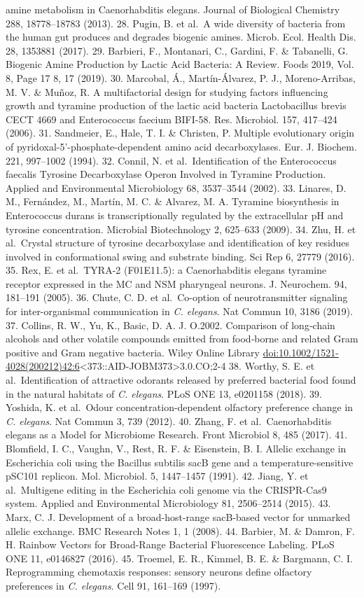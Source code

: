\documentclass[]{article}
\begin{document}
amine metabolism in Caenorhabditis elegans. Journal of Biological
Chemistry 288, 18778--18783 (2013). 28. Pugin, B. et al.~A wide
diversity of bacteria from the human gut produces and degrades biogenic
amines. Microb. Ecol. Health Dis. 28, 1353881 (2017). 29. Barbieri, F.,
Montanari, C., Gardini, F. \& Tabanelli, G. Biogenic Amine Production by
Lactic Acid Bacteria: A Review. Foods 2019, Vol. 8, Page 17 8, 17
(2019). 30. Marcobal, Á., Martín-Álvarez, P. J., Moreno-Arribas, M. V.
\& Muñoz, R. A multifactorial design for studying factors influencing
growth and tyramine production of the lactic acid bacteria Lactobacillus
brevis CECT 4669 and Enterococcus faecium BIFI-58. Res. Microbiol. 157,
417--424 (2006). 31. Sandmeier, E., Hale, T. I. \& Christen, P. Multiple
evolutionary origin of pyridoxal-5'-phosphate-dependent amino acid
decarboxylases. Eur. J. Biochem. 221, 997--1002 (1994). 32. Connil, N.
et al.~Identification of the Enterococcus faecalis Tyrosine
Decarboxylase Operon Involved in Tyramine Production. Applied and
Environmental Microbiology 68, 3537--3544 (2002). 33. Linares, D. M.,
Fernández, M., Martín, M. C. \& Alvarez, M. A. Tyramine biosynthesis in
Enterococcus durans is transcriptionally regulated by the extracellular
pH and tyrosine concentration. Microbial Biotechnology 2, 625--633
(2009). 34. Zhu, H. et al.~Crystal structure of tyrosine decarboxylase
and identification of key residues involved in conformational swing and
substrate binding. Sci Rep 6, 27779 (2016). 35. Rex, E. et al.~TYRA-2
(F01E11.5): a Caenorhabditis elegans tyramine receptor expressed in the
MC and NSM pharyngeal neurons. J. Neurochem. 94, 181--191 (2005). 36.
Chute, C. D. et al.~Co-option of neurotransmitter signaling for
inter-organismal communication in \textit{C. elegans}. Nat Commun 10,
3186 (2019). 37. Collins, R. W., Yu, K., Basic, D. A. J. O.2002.
Comparison of long‐chain alcohols and other volatile compounds emitted
from food‐borne and related Gram positive and Gram negative bacteria.
Wiley Online Library
\url{doi:10.1002/1521-4028(200212)42:6}\textless{}373::AID-JOBM373\textgreater{}3.0.CO;2-4
38. Worthy, S. E. et al.~Identification of attractive odorants released
by preferred bacterial food found in the natural habitats of
\textit{C. elegans}. PLoS ONE 13, e0201158 (2018). 39. Yoshida, K. et
al.~Odour concentration-dependent olfactory preference change in
\textit{C. elegans}. Nat Commun 3, 739 (2012). 40. Zhang, F. et
al.~Caenorhabditis elegans as a Model for Microbiome Research. Front
Microbiol 8, 485 (2017). 41. Blomfield, I. C., Vaughn, V., Rest, R. F.
\& Eisenstein, B. I. Allelic exchange in Escherichia coli using the
Bacillus subtilis sacB gene and a temperature-sensitive pSC101 replicon.
Mol. Microbiol. 5, 1447--1457 (1991). 42. Jiang, Y. et al.~Multigene
editing in the Escherichia coli genome via the CRISPR-Cas9 system.
Applied and Environmental Microbiology 81, 2506--2514 (2015). 43. Marx,
C. J. Development of a broad-host-range sacB-based vector for unmarked
allelic exchange. BMC Research Notes 1, 1 (2008). 44. Barbier, M. \&
Damron, F. H. Rainbow Vectors for Broad-Range Bacterial Fluorescence
Labeling. PLoS ONE 11, e0146827 (2016). 45. Troemel, E. R., Kimmel, B.
E. \& Bargmann, C. I. Reprogramming chemotaxis responses: sensory
neurons define olfactory preferences in \textit{C. elegans}. Cell 91,
161--169 (1997).
\end{document}
